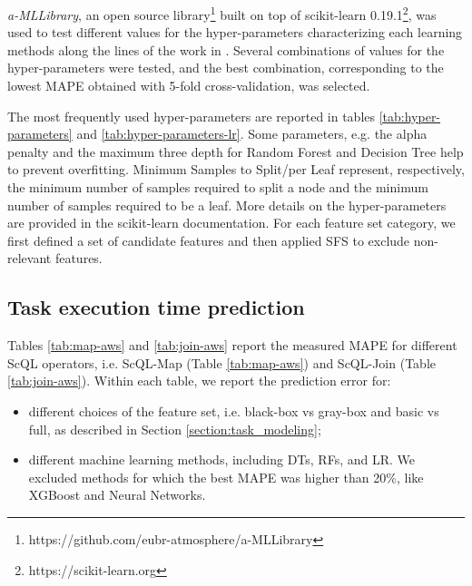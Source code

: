 \documentclass[a4paper, 10pt, conference]{ieeeconf}      %
\begin{document}


\textit{a-MLLibrary}, an open source  library\footnote{https://github.com/eubr-atmosphere/a-MLLibrary} built on top of scikit-learn 0.19.1\footnote{https://scikit-learn.org}, was used to test different values for the hyper-parameters characterizing each learning methods along the lines of the work in \cite{ARDAGNA2019}.
Several combinations of values for the hyper-parameters were tested, and the best combination, corresponding to the lowest MAPE obtained with 5-fold cross-validation, was selected.

The most frequently used hyper-parameters are reported in tables  \ref{tab:hyper-parameters} and \ref{tab:hyper-parameters-lr}. 
Some parameters, e.g. the alpha penalty and the maximum three depth for Random Forest and Decision Tree help to prevent overfitting. Minimum Samples to Split/per Leaf represent, respectively, the minimum number of samples required to split a node and the minimum number of samples required to be a leaf. More details on the hyper-parameters are provided in the scikit-learn documentation.
\color{black}
For each feature set category, we first defined a set of candidate features and then applied SFS to exclude non-relevant features.\color{black}

\subsection{Task execution time prediction}
\label{subsec:results-task}
Tables \ref{tab:map-aws} and   \ref{tab:join-aws}  report the measured MAPE for different ScQL operators, i.e. ScQL-Map (Table \ref{tab:map-aws}) and ScQL-Join (Table \ref{tab:join-aws}).
Within each table, we report the prediction error for:
\begin{itemize}
    \item different choices of the feature set, i.e. black-box vs gray-box and basic vs full, as described in Section \ref{section:task_modeling};
    \item different machine learning methods, including DTs, RFs, and LR. We excluded methods for which the best MAPE was higher than 20\%, like XGBoost and Neural Networks.
\end{itemize}



\end{document}
